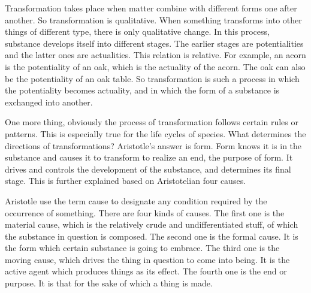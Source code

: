 \documentclass[11pt]{article}
\begin{document}
\newline

Transformation takes place when matter combine with different forms one after another. 
So transformation is qualitative. 
When something transforms into other things of different type, there is only qualitative change. 
In this process, substance develops itself into different stages. 
The earlier stages are potentialities and the latter ones are actualities. 
This relation is relative. 
For example, an acorn is the potentiality of an oak, which is the actuality of the acorn. 
The oak can also be the potentiality of an oak table. 
So transformation is such a process in which the potentiality becomes actuality, and in which the form of a substance is exchanged into another.

\newline

One more thing, obviously the process of transformation follows certain rules or patterns. 
This is especially true for the life cycles of species. 
What determines the directions of transformations? 
Aristotle’s answer is form. 
Form knows it is in the substance and causes it to transform to realize an end, the purpose of form. 
It drives and controls the development of the substance, and determines its final stage. 
This is further explained based on Aristotelian four causes.

\newline

Aristotle use the term cause to designate any condition required by the occurrence of something. 
There are four kinds of causes. 
The first one is the material cause, which is the relatively crude and undifferentiated stuff, of which the substance in question is composed. 
The second one is the formal cause. 
It is the form which certain substance is going to embrace. 
The third one is the moving cause, which drives the thing in question to come into being. 
It is the active agent which produces things as its effect. 
The fourth one is the end or purpose. 
It is that for the sake of which a thing is made.

\newline
\end{document}
